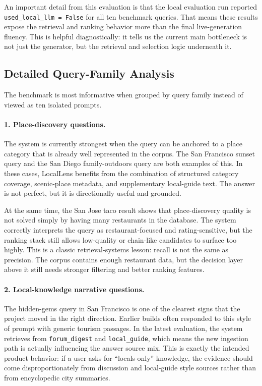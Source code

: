 \documentclass[11pt]{article}
\begin{document}
An important detail from this evaluation is that the local evaluation run reported \texttt{used\_local\_llm = False} for all ten benchmark queries. That means these results expose the retrieval and ranking behavior more than the final live-generation fluency. This is helpful diagnostically: it tells us the current main bottleneck is not just the generator, but the retrieval and selection logic underneath it.

\subsection{Detailed Query-Family Analysis}
The benchmark is most informative when grouped by query family instead of viewed as ten isolated prompts.

\paragraph{1. Place-discovery questions.}
The system is currently strongest when the query can be anchored to a place category that is already well represented in the corpus. The San Francisco sunset query and the San Diego family-outdoors query are both examples of this. In these cases, LocalLens benefits from the combination of structured category coverage, scenic-place metadata, and supplementary local-guide text. The answer is not perfect, but it is directionally useful and grounded.

At the same time, the San Jose taco result shows that place-discovery quality is not solved simply by having many restaurants in the database. The system correctly interprets the query as restaurant-focused and rating-sensitive, but the ranking stack still allows low-quality or chain-like candidates to surface too highly. This is a classic retrieval-systems lesson: recall is not the same as precision. The corpus contains enough restaurant data, but the decision layer above it still needs stronger filtering and better ranking features.

\paragraph{2. Local-knowledge narrative questions.}
The hidden-gems query in San Francisco is one of the clearest signs that the project moved in the right direction. Earlier builds often responded to this style of prompt with generic tourism passages. In the latest evaluation, the system retrieves from \texttt{forum\_digest} and \texttt{local\_guide}, which means the new ingestion path is actually influencing the answer source mix. This is exactly the intended product behavior: if a user asks for ``locals-only'' knowledge, the evidence should come disproportionately from discussion and local-guide style sources rather than from encyclopedic city summaries.
\end{document}
